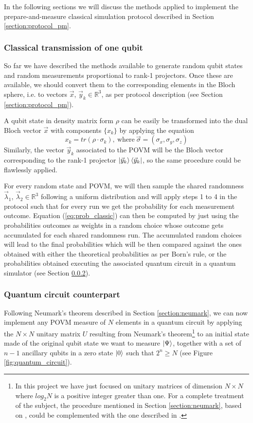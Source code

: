 In the following sections we will discuss the methods applied to implement the prepare-and-measure classical simulation protocol described in Section \ref{section:protocol_pm}.
\subsubsection{Classical transmission of one qubit}
So far we have described the methods available to generate random qubit states and random measurements proportional to rank-1 projectors. Once these are available, we should convert them to the corresponding elements in the Bloch sphere, i.e. to vectors $\vec{x}$, ${\vec{y}_k} \in \mathbb{R}^3$, as per protocol description (see Section \ref{section:protocol_pm}). 

A qubit state in density matrix form $\rho$ can be easily be transformed into the dual Bloch vector $\vec{x}$ with components $\{x_k\}$ by applying the equation
\begin{equation}
    x_k = tr(\rho \cdot \sigma_k),\ \text{where}\ \vec{\sigma} = (\sigma_x, \sigma_y, \sigma_z)
\end{equation}
Similarly, the vector ${\vec{y}_k}$ associated to the POVM will be the Bloch vector corresponding to the rank-1 projector $ \ket{\vec{y}_k} \bra{\vec{y}_k}$, so the same procedure could be flawlessly applied.

For every random state and POVM, we will then sample the shared randomness $\vec{\lambda}_1$, $\vec{\lambda}_2 \in \mathbb{R}^3$ following a uniform distribution and will apply steps 1 to 4 in the protocol such that for every run we get the probability for each measurement outcome. Equation (\ref{eq:prob_classic}) can then be computed by just using the probabilities outcomes as weights in a random choice whose outcome gets accumulated for each shared randomness run. The accumulated random choices will lead to the final probabilities which will be then compared against the ones obtained with either the theoretical probabilities as per Born's rule, or the probabilities obtained executing the associated quantum circuit in a quantum simulator (see Section \ref{section:quantum_circuit}).

\subsubsection{Quantum circuit counterpart}\label{section:quantum_circuit}
Following Neumark's theorem described in Section \ref{section:neumark}, we can now implement any POVM measure of $N$ elements in a quantum circuit by applying the $N\times N$ unitary matrix $U$ resulting from Neumark's theorem{\protect\footnote[1]{In this project we have just focused on unitary matrices of dimension $N\times N$ where $log_2 N$ is a positive integer greater than one. For a complete treatment of the subject, the procedure mentioned in Section \ref{section:neumark}, based on \cite{peres1995}, could be complemented with the one described in \cite{jozsa2003}.}} to an initial state made of the original qubit state we want to measure $\ket{\Psi}$, together with a set of $n-1$ ancillary qubits in a zero state $\ket{0}$ such that $2^n \ge N$ (see Figure \ref{fig:quantum_circuit}). 


